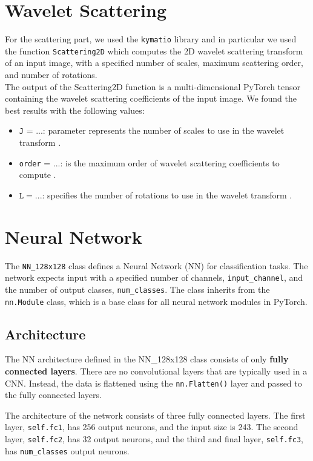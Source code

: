 \documentclass{report}
\begin{document}
\section{Wavelet Scattering}
For the scattering part, we used the \texttt{kymatio} library and in particular we used the function \texttt{Scattering2D} which computes the 2D wavelet scattering transform of an input image, with a specified number of scales, maximum scattering order, and number of rotations. \\
The output of the Scattering2D function is a multi-dimensional PyTorch tensor containing the wavelet scattering coefficients of the input image.
We found the best results with the following values:
\begin{itemize}
    \item \texttt{J} = ...: parameter represents the number of scales to use in the wavelet transform .
    \item \texttt{order} = ...: is the maximum order of wavelet scattering coefficients to compute .
    \item $\texttt{L} = ...$: specifies the number of rotations to use in the wavelet transform .
\end{itemize}
\section{Neural Network}
The \texttt{NN\_128x128} class defines a Neural Network (NN) for classification tasks. The network expects input with a specified number of channels, \texttt{input\_channel}, and the number of output classes, \texttt{num\_classes}. The class inherits from the \texttt{nn.Module} class, which is a base class for all neural network modules in PyTorch.

\subsection{Architecture}
The NN architecture defined in the NN\_128x128 class consists of only \textbf{fully connected layers}. There are no convolutional layers that are typically used in a CNN. Instead, the data is flattened using the \texttt{nn.Flatten()} layer and passed to the fully connected layers.

The architecture of the network consists of three fully connected layers. The first layer, \texttt{self.fc1}, has 256 output neurons, and the input size is 243. The second layer, \texttt{self.fc2}, has 32 output neurons, and the third and final layer, \texttt{self.fc3}, has \texttt{num\_classes} output neurons.
\end{document}

